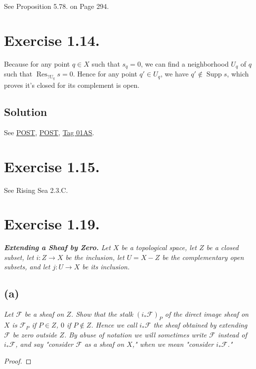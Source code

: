 See \cite{rotman2009introduction} Proposition 5.78. on Page 294.

\section{Exercise 1.14.}\label{Hart Chap 2 Ex 1.14.}

Because for any point $q\in X$ such that $s_q=0$, we can find a neighborhood $U_q$ of $q$ such that $\operatorname{Res}_{?U_q}s=0$. Hence for any point $q'\in U_q$, we have $q'\notin \operatorname{Supp} s$, which proves it's closed for its complement is open.

\subsection{Solution}

See \href{https://math.stackexchange.com/questions/2080018/prove-that-the-support-of-a-section-of-a-sheaf-is-a-closed-set}{POST}, \href{https://math.stackexchange.com/questions/2418007/the-support-of-a-sheaf-is-not-necessarily-closed#:~:text=Then%20we%20have%20Su,not%20closed%20in%20Zariski%20topology.}{POST}, \href{https://stacks.math.columbia.edu/tag/01AS}{Tag 01AS}.

\section{Exercise 1.15.}

See Rising Sea 2.3.C.

\section{Exercise 1.19.}\label{Hart Chap 2 Ex 1.19.}

\textit{\textbf{Extending a Sheaf by Zero.} Let $X$ be a topological space, let $Z$ be a closed subset, let $i:Z\to X$ be the inclusion, let $U=X-Z$ be the complementary open subsets, and let $j:U\to X$ be its inclusion.}

\subsection{(a)}
\textit{Let $\mathscr F$ be a sheaf on $Z$. Show that the stalk $(i_{\ast}\mathscr F)_P$ of the direct image sheaf on $X$ is $\mathscr F_P$ if $P\in Z$, $0$ if $P\notin Z$. Hence we call $i_{\ast}\mathscr F$ the sheaf obtained by extending $\mathscr F$ be zero outside $Z$. By abuse of notation we will sometimes write $\mathscr F$ instead of $i_{\ast}\mathscr F$, and say "consider $\mathscr F$ as a sheaf on $X$," when we mean "consider $i_{\ast}\mathscr F$."}
\begin{proof}
    
\end{proof}

